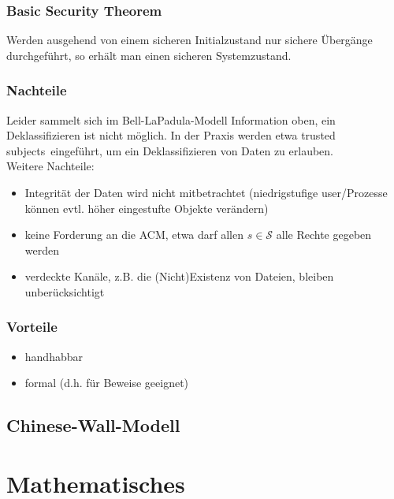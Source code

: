 \documentclass[a4paper,twoside,DIV15,BCOR12mm]{scrbook}
\begin{document}
\subsection{Basic Security Theorem}

Werden ausgehend von einem sicheren Initialzustand nur sichere Übergänge durchgeführt, so erhält man einen sicheren Systemzustand.

\subsection{Nachteile}

Leider sammelt sich im Bell-LaPadula-Modell Information \glqq oben\grqq, ein Deklassifizieren ist nicht möglich. In der Praxis werden etwa \glqq trusted subjects\grqq\ eingeführt, um ein Deklassifizieren von Daten zu erlauben.\\

Weitere Nachteile:

\begin{itemize}
	\item Integrität der Daten wird nicht mitbetrachtet (niedrigstufige user/Prozesse können evtl. höher eingestufte Objekte verändern)
	\item keine Forderung an die ACM, etwa darf allen $s \in \mathcal{S}$ alle Rechte gegeben werden
	\item verdeckte Kanäle, z.B. die (Nicht)Existenz von Dateien, bleiben unberücksichtigt
\end{itemize}

\subsection{Vorteile}

\begin{itemize}
	\item handhabbar
	\item formal (d.h. für Beweise geeignet)
\end{itemize}

\section{Chinese-Wall-Modell}
		

\chapter{Mathematisches} \label{mathe}
\end{document}
